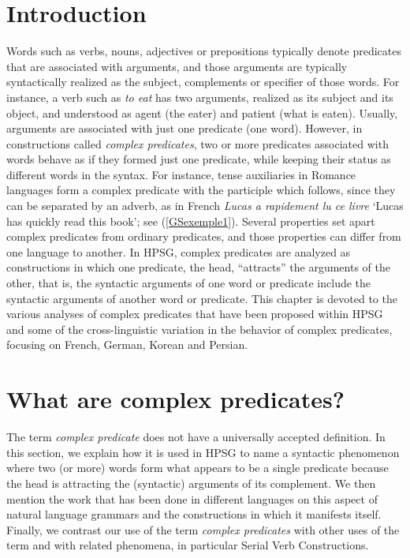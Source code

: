 {


\section{Introduction}

Words such as verbs, nouns, adjectives or prepositions typically denote predicates that are associated with arguments, and those arguments are typically syntactically realized as the subject, complements or specifier of those words. For instance, a verb such as \textit{to eat} has two arguments, realized as its subject and its object, and understood as agent (the eater) and patient (what is eaten). Usually, arguments are associated with just one predicate (one word). However, in constructions called \textit{complex predicates}, two or more predicates associated with words behave as if they formed just one predicate, while keeping their status as different words in the syntax. 
For instance, tense auxiliaries in Romance languages form a complex predicate with the participle which follows, since they can be separated by an adverb, as in French \emph{Lucas a rapidement lu ce livre} `Lucas has quickly read this book'; see (\ref{GSexemple1}).
Several properties set apart complex predicates from ordinary predicates, and those properties can differ from one language to another. In HPSG, complex predicates are analyzed as constructions in which one predicate, the head, ``attracts'' the arguments of the other, that is, the syntactic arguments of one word or predicate include the syntactic arguments of another word or predicate. This chapter is devoted to the various analyses of complex predicates that have been proposed within HPSG and some of the cross-linguistic variation in the behavior of complex predicates, focusing on French, German, Korean and Persian. 

\section{What are complex predicates?}


The term \textit{complex predicate} does not have a universally accepted definition. In this section, we explain
how it is used in HPSG to name a syntactic phenomenon where two (or more) words 
form what appears to be a single predicate because the head is attracting the (syntactic) arguments of its complement.
We then mention the work that has been done in different languages on this aspect of natural language grammars and the constructions in which it manifests itself. 
Finally, we contrast our use of the term \textit{complex predicates} with other uses of the term and with related phenomena, in particular Serial Verb Constructions. 

}
